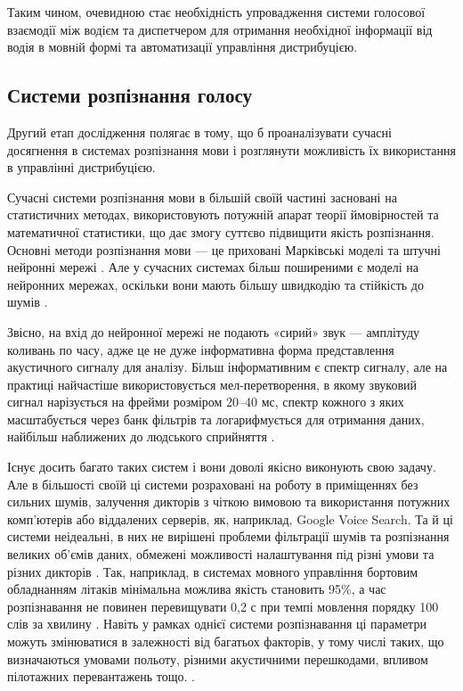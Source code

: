 Таким чином, очевидною стає необхідність упровадження системи голосової взаємодії між водієм та диспетчером для отримання необхідної інформації від водія в мовнiй формі та автоматизації управління дистрибуцією.

\subsection{Системи розпізнання голосу}
Другий етап дослідження полягає в тому, що б проаналізувати сучасні досягнення в системах розпізнання мови і розглянути можливість їх використання в управлінні дистрибуцією.

Сучасні системи розпізнання мови в більшій своїй частині засновані на статистичних методах, використовують потужній апарат теорії ймовірностей та математичної статистики, що дає змогу суттєво підвищити якість розпізнання. Основні методи розпізнання мови — це приховані Марківські моделі та штучні нейронні мережі \cite{Makovkin_2006, Gefke_2012}. Але у сучасних системах більш поширеними є моделі на нейронних мережах, оскільки вони мають більшу швидкодію та стійкість до шумів \cite{Hinton_2012}.

Звісно, на вхід до нейронної мережі не подають «сирий» звук — амплітуду коливань по часу, адже це не дуже інформативна форма представлення акустичного сигналу для аналізу. Більш інформативним є спектр сигналу, але на практиці найчастіше використовується мел-перетворення, в якому звуковий сигнал нарізується на фрейми розміром 20–40 мс, спектр кожного з яких масштабується через банк фільтрів та логарифмується для отримання даних, найбільш наближених до людського сприйняття \cite{Saini_2013}.

Існує досить багато таких систем і вони доволі якісно виконують свою задачу. Але в більшості своїй ці системи розраховані на роботу в приміщеннях без сильних шумів, залучення дикторів з чіткою вимовою та використання потужних комп’ютерів або віддалених серверів, як, наприклад, Google Voice Search. Та й ці системи неідеальні, в них не вирішені проблеми фільтрації шумів та розпізнання великих об’ємів даних, обмежені можливості налаштування під різні умови та різних дикторів \cite{Volkov_2014}. Так, наприклад, в системах мовного управління бортовим обладнанням літаків мінімальна можлива якість становить 95\%, а час розпізнавання не повинен перевищувати 0,2 с при темпі мовлення порядку 100 слів за хвилину \cite{Bondaros_2007}. Навіть у рамках однієї системи розпізнавання ці параметри можуть змінюватися в залежності від багатьох факторів, у тому числі таких, що визначаються умовами польоту, різними акустичними перешкодами, впливом пілотажних перевантажень тощо. \cite{Korsun_2013}.

